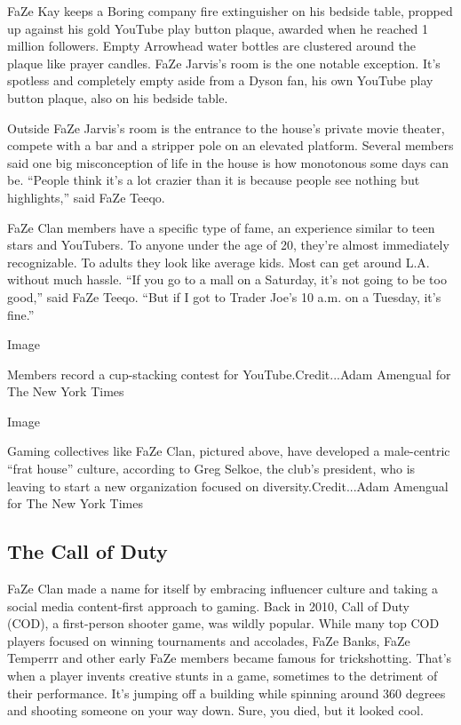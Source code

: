 FaZe Kay keeps a Boring company fire extinguisher on his bedside table,
propped up against his gold YouTube play button plaque, awarded when he
reached 1 million followers. Empty Arrowhead water bottles are clustered
around the plaque like prayer candles. FaZe Jarvis's room is the one
notable exception. It's spotless and completely empty aside from a Dyson
fan, his own YouTube play button plaque, also on his bedside table.

Outside FaZe Jarvis's room is the entrance to the house's private movie
theater, compete with a bar and a stripper pole on an elevated platform.
Several members said one big misconception of life in the house is how
monotonous some days can be. ``People think it's a lot crazier than it
is because people see nothing but highlights,'' said FaZe Teeqo.

FaZe Clan members have a specific type of fame, an experience similar to
teen stars and YouTubers. To anyone under the age of 20, they're almost
immediately recognizable. To adults they look like average kids. Most
can get around L.A. without much hassle. ``If you go to a mall on a
Saturday, it's not going to be too good,'' said FaZe Teeqo. ``But if I
got to Trader Joe's 10 a.m. on a Tuesday, it's fine.''

Image

Members record a cup-stacking contest for YouTube.Credit...Adam Amengual
for The New York Times

Image

Gaming collectives like FaZe Clan, pictured above, have developed a
male-centric ``frat house'' culture, according to Greg Selkoe, the
club's president, who is leaving to start a new organization focused on
diversity.Credit...Adam Amengual for The New York Times

\hypertarget{the-call-of-duty}{%
\subsection{The Call of Duty}\label{the-call-of-duty}}

FaZe Clan made a name for itself by embracing influencer culture and
taking a social media content-first approach to gaming. Back in 2010,
Call of Duty (COD), a first-person shooter game, was wildly popular.
While many top COD players focused on winning tournaments and accolades,
FaZe Banks, FaZe Temperrr and other early FaZe members became famous for
trickshotting. That's when a player invents creative stunts in a game,
sometimes to the detriment of their performance. It's jumping off a
building while spinning around 360 degrees and shooting someone on your
way down. Sure, you died, but it looked cool.

